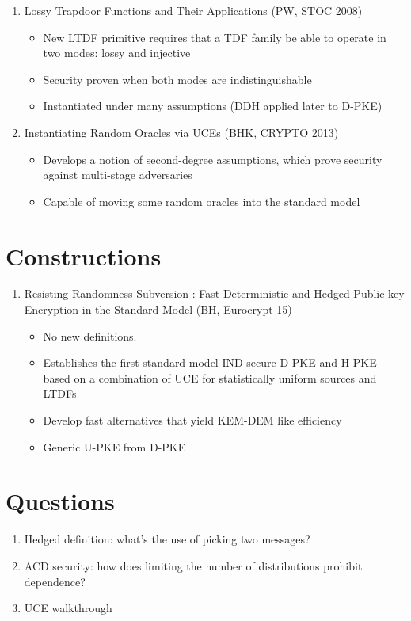 \documentclass[11pt, pdftex]{article}
\begin{document}
\begin{enumerate}
\item Lossy Trapdoor Functions and Their Applications (PW, STOC 2008)
\begin{itemize}
\item New LTDF primitive requires that a TDF family be able to operate in two modes: lossy and injective
\item Security proven when both modes are indistinguishable
\item Instantiated under many assumptions (DDH applied later to D-PKE)
\end{itemize}

\item Instantiating Random Oracles via UCEs (BHK, CRYPTO 2013)
\begin{itemize}
\item Develops a notion of second-degree assumptions, which prove security against multi-stage adversaries
\item Capable of moving some random oracles into the standard model
\end{itemize}
\end{enumerate}

\section{Constructions}

\begin{enumerate}
\item Resisting Randomness Subversion : Fast Deterministic and Hedged Public-key Encryption in the Standard Model (BH, Eurocrypt 15)
\begin{itemize}
\item No new definitions.
\item Establishes the first standard model IND-secure D-PKE and H-PKE based on a combination of UCE for statistically uniform sources and LTDFs
\item Develop fast alternatives that yield KEM-DEM like efficiency
\item Generic U-PKE from D-PKE
\end{itemize}
\end{enumerate}


\section{Questions}
\begin{enumerate}
\item Hedged definition: what's the use of picking two messages?
\item ACD security: how does limiting the number of distributions prohibit dependence?
\item UCE walkthrough
\end{enumerate}



\end{document}
